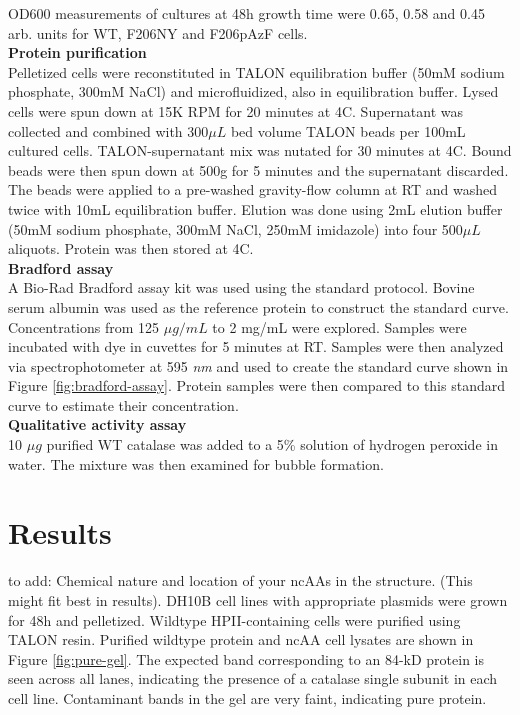 \documentclass[journal=jacsat,manuscript=article]{achemso}
\begin{document}
OD600 measurements of cultures at 48h growth time were 0.65, 0.58 and 0.45 arb. units for WT, F206NY and F206pAzF cells.\\

\textbf{Protein purification}\\
Pelletized cells were reconstituted in TALON equilibration buffer (50mM sodium phosphate, 300mM NaCl) and microfluidized, also in equilibration buffer. Lysed cells were spun down at 15K RPM for 20 minutes at 4C. Supernatant was collected and combined with 300$\mu L$ bed volume TALON beads per 100mL cultured cells. TALON-supernatant mix was nutated for 30 minutes at 4C. Bound beads were then spun down at 500g for 5 minutes and the supernatant discarded. The beads were applied to a pre-washed gravity-flow column at RT and washed twice with 10mL equilibration buffer. Elution was done using 2mL elution buffer (50mM sodium phosphate, 300mM NaCl, 250mM imidazole) into four 500$\mu L$ aliquots. Protein was then stored at 4C.\\

\textbf{Bradford assay}\\
A Bio-Rad Bradford assay kit was used using the standard protocol. Bovine serum albumin was used as the reference protein to construct the standard curve. Concentrations from 125 $\mu g / mL$ to 2 mg/mL were explored. Samples were incubated with dye in cuvettes for 5 minutes at RT. Samples were then analyzed via spectrophotometer at 595 \textit{nm} and used to create the standard curve shown in Figure \ref{fig:bradford-assay}. Protein samples were then compared to this standard curve to estimate their concentration.\\

\textbf{Qualitative activity assay}\\
10 $\mu g$ purified WT catalase was added to a 5\% solution of hydrogen peroxide in water. The mixture was then examined for bubble formation.\\

\section{Results}
to add: Chemical nature and location of your ncAAs in the structure. (This might fit best in results).
DH10B cell lines with appropriate plasmids were grown for 48h and pelletized. Wildtype HPII-containing cells were purified using TALON resin. Purified wildtype protein and ncAA cell lysates are shown in Figure \ref{fig:pure-gel}. The expected band corresponding to an 84-kD protein is seen across all lanes, indicating the presence of a catalase single subunit in each cell line. Contaminant bands in the gel are very faint, indicating pure protein.\\
\end{document}
